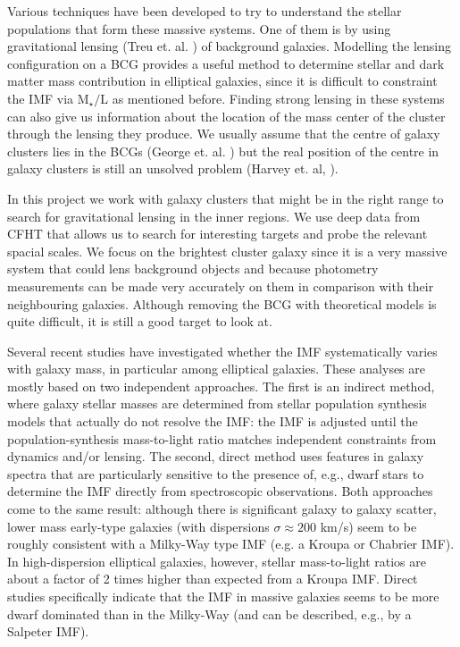 Various techniques have been developed to try to understand the stellar populations that form these massive systems. One of them is by using gravitational lensing (Treu et. al. \citeyear{Reference1})  of  background galaxies. Modelling the lensing configuration on a BCG provides a useful method to determine stellar and dark matter mass contribution in elliptical galaxies, since it is difficult to constraint the IMF via $\textrm{M}_{\star}/\text{L}$ as mentioned before. Finding strong lensing in these systems can also give us information about the location of the mass center of the cluster through the lensing they produce. We usually assume that the centre of galaxy clusters lies in the BCGs (George et. al. \citeyear{Reference18}) but the real position of the centre in galaxy clusters is still an unsolved problem (Harvey et. al, \citeyear{Reference13}). 

In this project we work with galaxy clusters that might be in the right range to search for gravitational lensing in the inner regions. We use deep data from CFHT that allows us to search for interesting targets and probe the relevant spacial scales. We focus on the brightest cluster galaxy since it is a very massive system that could lens background objects and because photometry measurements can be made very accurately on them in comparison with their neighbouring galaxies. Although removing the BCG with theoretical models is quite difficult, it is still a good target to look at. 

Several recent studies have investigated whether the IMF systematically varies with galaxy mass, in particular among elliptical galaxies. These analyses are mostly based on two independent approaches. The first is an indirect method, where galaxy stellar masses are determined from stellar population synthesis models that actually do not resolve the IMF: the IMF is adjusted until the population-synthesis mass-to-light ratio matches independent constraints from dynamics and/or lensing. The second, direct method uses features in galaxy spectra that are particularly sensitive to the presence of, e.g., dwarf stars to determine the IMF directly from spectroscopic observations. Both approaches come to the same result: although there is significant galaxy to galaxy scatter, lower mass early-type galaxies (with dispersions $\sigma \approx 200$ km/s) seem to be roughly consistent with a Milky-Way type IMF (e.g. a Kroupa or Chabrier IMF). In high-dispersion elliptical galaxies, however, stellar mass-to-light ratios are about a factor of 2 times higher than expected from a Kroupa IMF. Direct studies specifically indicate that the IMF in massive galaxies seems to be more dwarf dominated than in the Milky-Way (and can be described, e.g., by a Salpeter IMF).

